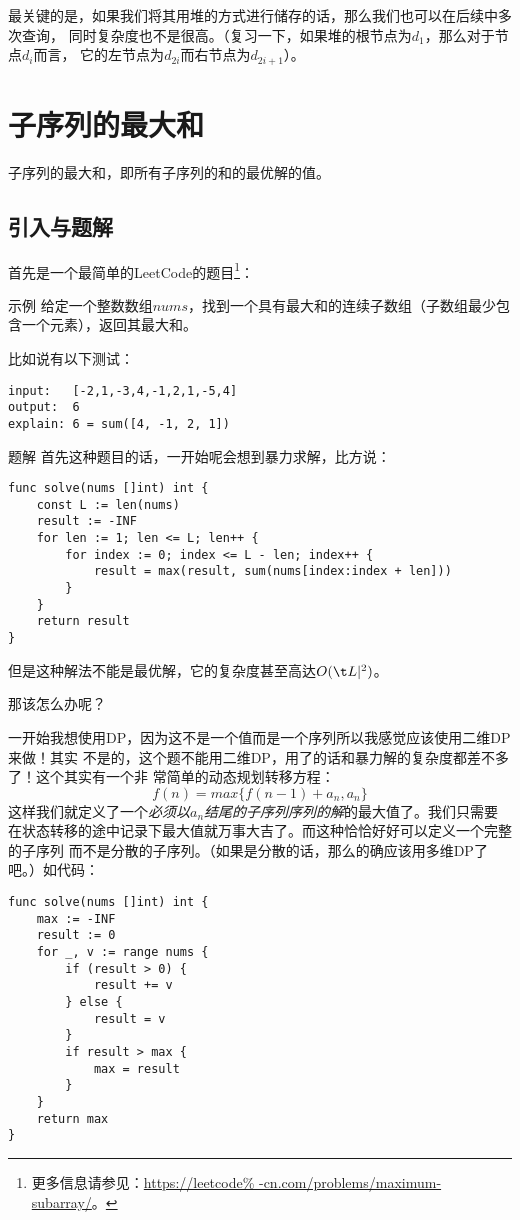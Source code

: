 最关键的是，如果我们将其用堆的方式进行储存的话，那么我们也可以在后续中多次查询，
同时复杂度也不是很高。（复习一下，如果堆的根节点为$d_1$，那么对于节点$d_i$而言，
它的左节点为$d_{2i}$而右节点为$d_{2i+1}$）。


\section{子序列的最大和}

子序列的最大和，即所有子序列的和的最优解的值。

\subsection{引入与题解}

首先是一个最简单的LeetCode的题目\footnote{更多信息请参见：\url{https://leetcode%
-cn.com/problems/maximum-subarray/}。}：
\begin{Exple}{示例}
给定一个整数数组$nums$，找到一个具有最大和的连续子数组（子数组最少包含一个元素），返回其最大和。

比如说有以下测试：
\begin{lstlisting}
input:   [-2,1,-3,4,-1,2,1,-5,4]
output:  6
explain: 6 = sum([4, -1, 2, 1])
\end{lstlisting}
\end{Exple}
\begin{Exple}{题解}
首先这种题目的话，一开始呢会想到暴力求解，比方说：
\begin{lstlisting}
func solve(nums []int) int {
    const L := len(nums)
    result := -INF
    for len := 1; len <= L; len++ {
        for index := 0; index <= L - len; index++ {
            result = max(result, sum(nums[index:index + len]))
        }
    }
    return result
}
\end{lstlisting}

但是这种解法不能是最优解，它的复杂度甚至高达$O(\t L|^2)$。

那该怎么办呢？
\end{Exple}

一开始我想使用DP，因为这不是一个值而是一个序列所以我感觉应该使用二维DP来做！其实
不是的，这个题不能用二维DP，用了的话和暴力解的复杂度都差不多了！这个其实有一个非
常简单的动态规划转移方程：
$$f(n) = max\{f(n-1)+a_n, a_n\}$$
这样我们就定义了一个\emph{必须以$a_n$结尾的子序列序列的解}的最大值了。我们只需要
在状态转移的途中记录下最大值就万事大吉了。而这种恰恰好好可以定义一个完整的子序列
而不是分散的子序列。（如果是分散的话，那么的确应该用多维DP了吧。）如代码：
\begin{lstlisting}
func solve(nums []int) int {
    max := -INF
    result := 0
    for _, v := range nums {
        if (result > 0) {
            result += v
        } else {
            result = v
        }
        if result > max {
            max = result
        }
    }
    return max
}
\end{lstlisting}

